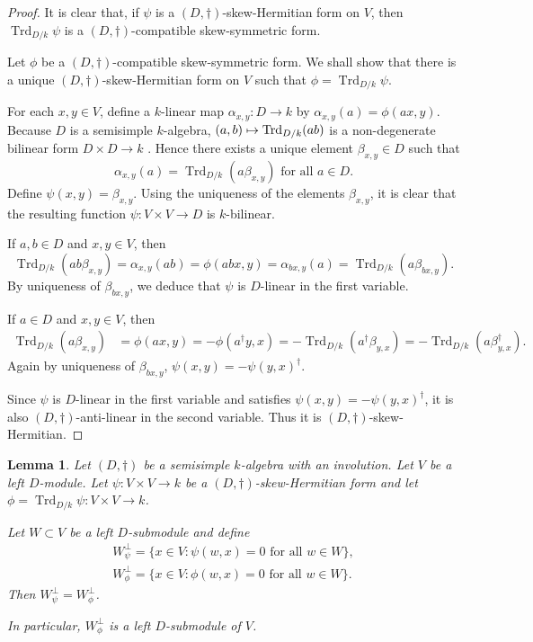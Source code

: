 \documentclass[JEP,XML,SOM,Unicode,NoFloatCountersInSection]{cedram}
\def\mto{\mathchoice{\longmapsto}{\mapsto}{\mapsto}{\mapsto}}
\DeclareMathOperator{\Trd}{Trd}
\newtheorem{lemma}{Lemma}[section]
\begin{document}
\begin{proof}
It is clear that, if $\psi$ is a $(D,\dag)$-skew-Hermitian form on $V$, then $\Trd_{D/k} \psi$ is a $(D,\dag)$-compatible skew-symmetric form.

Let $\phi$ be a $(D,\dag)$-compatible skew-symmetric form.
We shall show that there is a unique $(D,\dag)$-skew-Hermitian form on $V$ such that $\phi = \Trd_{D/k} \psi$.

For each $x,y \in V$, define a $k$-linear map $\alpha_{x,y} \colon D \to k$ by $\alpha_{x,y}(a) = \phi(ax, y)$.
Because $D$ is a semisimple $k$-algebra, $(a,b) \mto \Trd_{D/k}(ab)$ is a non-degenerate bilinear form $D \times D \to k$ \cite[Th.\,9.26]{Rei75}.
Hence there exists a unique element $\beta_{x,y} \in D$ such that
\[
\alpha_{x,y}(a) = \Trd_{D/k}(a\beta_{x,y}) \text{ for all } a \in D.
\]
Define $\psi(x,y) = \beta_{x,y}$.
Using the uniqueness of the elements $\beta_{x,y}$, it is clear that the resulting function $\psi \colon V \times V \to D$ is $k$-bilinear.

If $a, b \in D$ and $x,y \in V$, then
\[
\Trd_{D/k}(ab\beta_{x,y}) = \alpha_{x,y}(ab) = \phi(abx, y) = \alpha_{bx,y}(a) = \Trd_{D/k}(a\beta_{bx,y}).
\]
By uniqueness of $\beta_{bx,y}$, we deduce that $\psi$ is $D$-linear in the first variable.

If $a \in D$ and $x, y \in V$, then
\begin{align*}
\Trd_{D/k}(a\beta_{x,y})
& = \phi(ax, y) = -\phi(a^\dag y, x)
= -\Trd_{D/k}(a^\dag \beta_{y, x}) = -\Trd_{D/k}(a\beta_{y,x}^\dag).
\end{align*}
Again by uniqueness of $\beta_{bx,y}$, $\psi(x,y) = -\psi(y,x)^\dag$.

Since $\psi$ is $D$-linear in the first variable and satisfies $\psi(x,y) = -\psi(y,x)^\dag$, it is also $(D,\dag)$-anti-linear in the second variable.
Thus it is $(D,\dag)$-skew-Hermitian.
\end{proof}

\begin{lemma} \label{orthog-complements}
Let $(D, \dag)$ be a semisimple $k$-algebra with an involution.
Let $V$ be a left $D$-module.
Let $\psi \colon V \times V \to k$ be a $(D,\dag)$-skew-Hermitian form and let $\phi = \Trd_{D/k} \psi \colon V \times V \to k$.

Let $W \subset V$ be a left $D$-submodule and define
\begin{gather*}
W_\psi^\perp = \{ x \in V : \psi(w,x) = 0 \text{ for all } w \in W \},
\\ W_\phi^\perp = \{ x \in V : \phi(w,x) = 0 \text{ for all } w \in W \}.
\end{gather*}
Then $W_\psi^\perp = W_\phi^\perp$.

In particular, $W_\phi^\perp$ is a left $D$-submodule of $V$.
\end{lemma}
\end{document}
